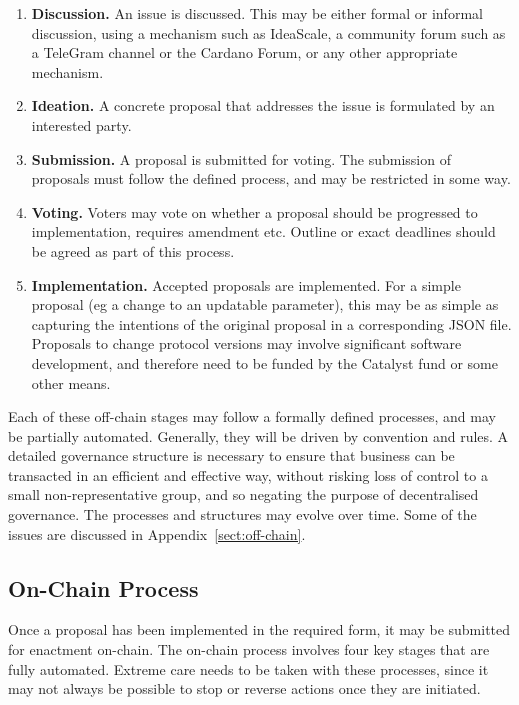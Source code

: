 \begin{enumerate}
\item
  \textbf{Discussion.}  An issue is discussed.  This may be either formal or informal discussion, using a mechanism such as IdeaScale, a community forum such as a TeleGram channel or the Cardano Forum,
  or any other appropriate mechanism.
\item
  \textbf{Ideation.}  A concrete proposal that addresses the issue is formulated by an interested party.
\item
  \textbf{Submission.}  A proposal is submitted for voting.  The submission of proposals must follow the defined process, and may be restricted in some way.
\item
  \textbf{Voting.}  Voters may vote on whether a proposal should be progressed to implementation, requires amendment etc.  Outline or exact deadlines should be agreed as part of this process.
\item
  \textbf{Implementation.}  Accepted proposals are implemented.  For a simple proposal (eg a change to an updatable parameter), this may be as simple as capturing the intentions of the original proposal in a corresponding JSON file.
  Proposals to change protocol versions may involve significant software development, and therefore need to be funded by the Catalyst fund or some other means.
\end{enumerate}

Each of these off-chain stages may follow a formally defined processes, and may be partially automated.  Generally, they will be driven by convention and rules.  A detailed governance structure is necessary to ensure that business can
be transacted in an efficient and effective way, without risking loss of control to a small non-representative group, and so negating the purpose of decentralised governance.
The processes and structures may evolve over time.  Some of the issues are discussed in Appendix~\ref{sect:off-chain}.


\newpage
\subsection{On-Chain Process}

Once a proposal has been implemented in the required form, it may be submitted for enactment on-chain.  The on-chain process involves four key stages that are fully automated.  Extreme care needs to be taken with these processes,
since it may not always be possible to stop or reverse actions once they are initiated.

